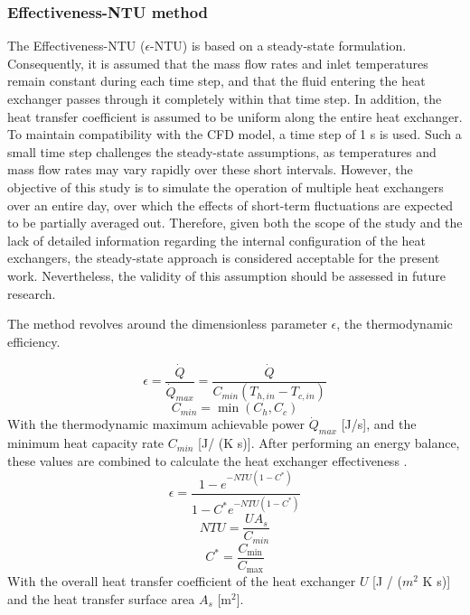 \subsubsection{Effectiveness-NTU method}
The Effectiveness-NTU ($\epsilon$-NTU) is based on a steady-state formulation. Consequently, it is assumed that the mass flow rates and inlet temperatures remain constant during each time step, and that the fluid entering the heat exchanger passes through it completely within that time step. In addition, the heat transfer coefficient is assumed to be uniform along the entire heat exchanger. To maintain compatibility with the CFD model, a time step of 1 s is used. Such a small time step challenges the steady-state assumptions, as temperatures and mass flow rates may vary rapidly over these short intervals. However, the objective of this study is to simulate the operation of multiple heat exchangers over an entire day, over which the effects of short-term fluctuations are expected to be partially averaged out. Therefore, given both the scope of the study and the lack of detailed information regarding the internal configuration of the heat exchangers, the steady-state approach is considered acceptable for the present work. Nevertheless, the validity of this assumption should be assessed in future research.

The method revolves around the dimensionless parameter $\epsilon$, the thermodynamic efficiency. 

\begin{equation}\label{eq::epsilon}
    \epsilon = \frac{\dot{Q}}{\dot{Q}_{max}} = \frac{\dot{Q}}{{C}_{min}(T_{h,in} - T_{c,in})}
\end{equation}
\begin{equation}
    C_{min} = \min(C_h, C_c)
\end{equation}
With the thermodynamic maximum achievable power $\dot{Q}_{max}$ [J/s], and the minimum heat capacity rate $C_{min}$ [J/ (K s)]. After performing an energy balance, these values are combined to calculate the heat exchanger effectiveness \cite{cengel2025heat}.
\begin{equation}
    \epsilon = \frac{1 - e^{-NTU  (1 - C^*)}}{1 - C^*  e^{-NTU (1 - C^*)}}
\end{equation}
\begin{equation}
    NTU = \frac{U A_s}{C_{min}}
\end{equation}
\begin{equation}
    C^{*} = \frac{C_{\min}}{C_{\max}}
\end{equation}
With the overall heat transfer coefficient of the heat exchanger $U$ [J / ($m^2$ K  s)] and the heat transfer surface area $A_{s}$ [m$^2$].

